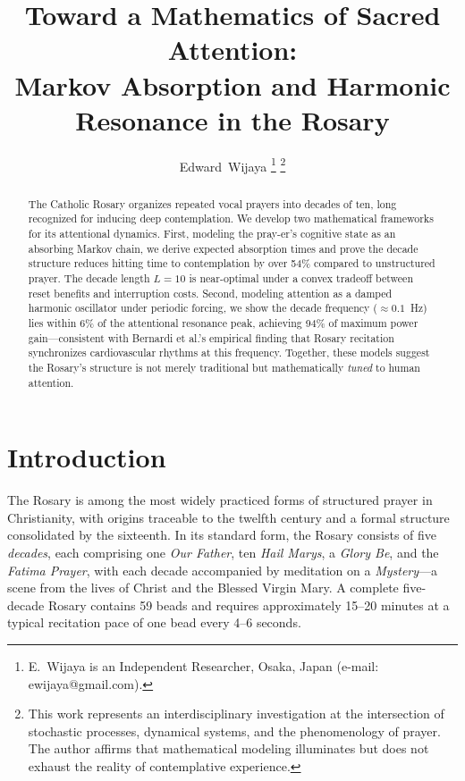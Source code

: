 \documentclass[journal]{IEEEtran}
\title{Toward a Mathematics of Sacred Attention:\\Markov Absorption and Harmonic Resonance in the Rosary}
\author{Edward~Wijaya%
\thanks{E.~Wijaya is an Independent Researcher, Osaka, Japan (e-mail: ewijaya@gmail.com).}%
\thanks{This work represents an interdisciplinary investigation at the intersection of stochastic processes, dynamical systems, and the phenomenology of prayer. The author affirms that mathematical modeling illuminates but does not exhaust the reality of contemplative experience.}
}
\theoremstyle{definition}
\theoremstyle{remark}
\begin{document}
\maketitle

\begin{abstract}
The Catholic Rosary organizes repeated vocal prayers into decades of ten, long recognized for inducing deep contemplation. We develop two mathematical frameworks for its attentional dynamics. First, modeling the pray-er's cognitive state as an absorbing Markov chain, we derive expected absorption times and prove the decade structure reduces hitting time to contemplation by over 54\% compared to unstructured prayer. The decade length $L=10$ is near-optimal under a convex tradeoff between reset benefits and interruption costs. Second, modeling attention as a damped harmonic oscillator under periodic forcing, we show the decade frequency ($\approx 0.1$~Hz) lies within 6\% of the attentional resonance peak, achieving 94\% of maximum power gain---consistent with Bernardi et al.'s empirical finding that Rosary recitation synchronizes cardiovascular rhythms at this frequency. Together, these models suggest the Rosary's structure is not merely traditional but mathematically \emph{tuned} to human attention.
\end{abstract}

\section{Introduction}

The Rosary is among the most widely practiced forms of structured prayer in Christianity, with origins traceable to the twelfth century and a formal structure consolidated by the sixteenth. In its standard form, the Rosary consists of five \emph{decades}, each comprising one \emph{Our Father}, ten \emph{Hail Marys}, a \emph{Glory Be}, and the \emph{Fatima Prayer}, with each decade accompanied by meditation on a \emph{Mystery}---a scene from the lives of Christ and the Blessed Virgin Mary. A complete five-decade Rosary contains 59 beads and requires approximately 15--20 minutes at a typical recitation pace of one bead every 4--6 seconds.
\end{document}
